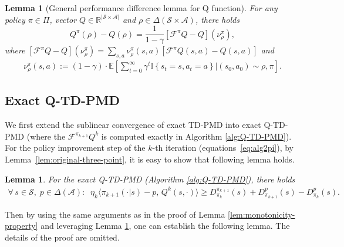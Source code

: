 \documentclass[10pt]{article}
\newcommand{\calA}{\mathcal{A}}
\newcommand{\calS}{\mathcal{S}}
\newcommand{\calF}{\mathcal{F}}
\theoremstyle{plain}
\newtheorem{lemma}[theorem]{Lemma}
\theoremstyle{definition}
\begin{document}
\begin{lemma}[General performance difference lemma for Q function] \label{lem:extended-pdl-q}
    For any policy $\pi \in \Pi$, vector $Q \in \mathbb{R}^{|\calS\times\calA|}$ and $\rho \in \Delta(\mathcal{S}\times\mathcal{A})$, there holds 
    \[
        Q^\pi(\rho) - Q(\rho) = \frac{1}{1-\gamma} [\calF^\pi Q - Q](\nu^\pi_\rho),
    \]
where $[\calF^\pi Q - Q](\nu^\pi_\rho)=\sum\limits_{s,a} \nu^\pi_\rho(s,a)[\calF^\pi Q(s,a) - Q(s,a)]$ and 
\begin{align*}
\nu _{\rho}^{\pi}\left( s,a \right) :=(1-\gamma)\cdot\mathbb{E} \left[ \sum_{t=0}^{\infty}{\gamma ^t\mathbb{I} \left\{ s_t=s,a_t=a \right\}}|(s_0,a_0)\sim \rho ,\pi \right].
\end{align*}
\end{lemma}





\subsection{Exact Q-TD-PMD}
 We first extend the sublinear convergence of exact TD-PMD into exact Q-TD-PMD (where the  $
\mathcal{F} ^{\pi _{k+1}}Q^k$ is computed exactly in Algorithm \ref{alg:Q-TD-PMD}). For the policy improvement step of the $k$-th iteration (equations~\eqref{eq:alg2pi}), by Lemma~\ref{lem:original-three-point}, it is easy to show that following lemma holds.
\begin{lemma} 
\label{lem:Q-TD-PMD-three-point-original}
For the exact Q-TD-PMD (Algorithm \ref{alg:Q-TD-PMD}), there holds \begin{align*}
    \forall\, s\in\calS,\; p\in\Delta(\calA): \;\; \eta_k \langle \pi_{k+1}(\cdot|s) - p, \, Q^k(s,\cdot) \rangle \geq D^{\pi_{k+1}}_{\pi_k}(s) + D^p_{\pi_{k+1}}(s) - D^p_{\pi_k}(s).
\end{align*}
\end{lemma}
Then by using the same arguments  as in the proof of Lemma \ref{lem:monotonicity-property} and leveraging Lemma \ref{lem:Q-TD-PMD-three-point-original}, one can establish the following lemma. The details of the proof are omitted.
\end{document}
